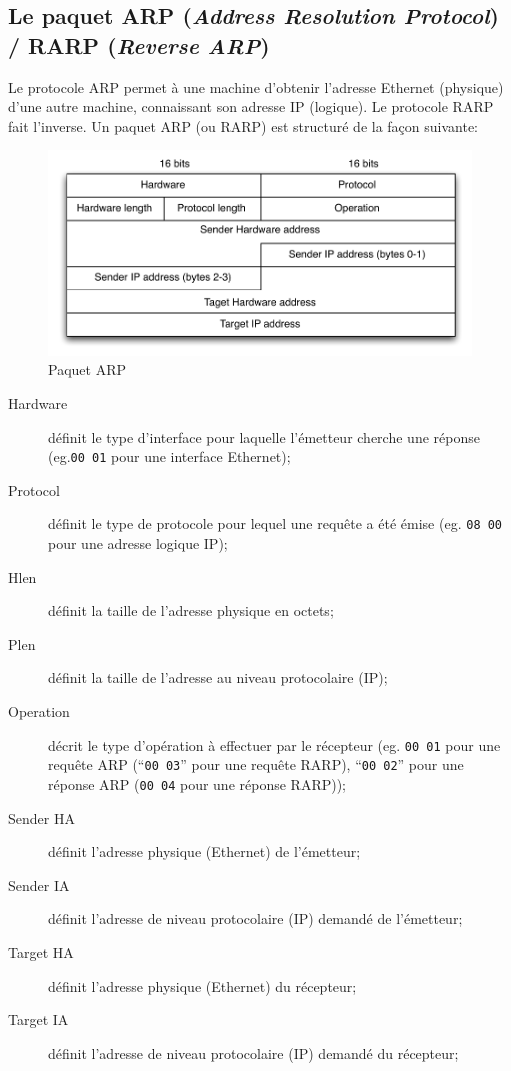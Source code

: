 \documentclass[11pt,english,french]{scrreprt}
\theoremstyle{remark}
\theoremstyle{definition}
\begin{document}
\subsection{Le paquet ARP (\emph{Address Resolution Protocol}) / RARP (\emph{Reverse ARP})} %

Le protocole ARP permet à une machine d'obtenir l'adresse Ethernet (physique) d'une autre machine, connaissant son adresse IP (logique). Le protocole RARP fait l'inverse. Un paquet ARP (ou RARP) est structuré de la façon suivante:

\begin{figure}[h!]
	\center
	\includegraphics[scale=.75]{graphes/IP/ARP}
	\caption{Paquet ARP}
\end{figure}

\begin{description}
	\item [Hardware] définit le type d'interface pour laquelle l'émetteur cherche une réponse (eg.\lstinline!00 01! pour une interface Ethernet);
	\item [Protocol] définit le type de protocole pour lequel une requête a été émise (eg. \lstinline!08 00! pour une adresse logique IP);
	\item [Hlen] définit la taille de l'adresse physique en octets;
	\item [Plen] définit la taille de l'adresse au niveau protocolaire (IP);
	\item [Operation] décrit le type d'opération à effectuer par le récepteur (eg. \lstinline!00 01! pour une requête ARP (“\lstinline!00 03!” pour une requête RARP), “\lstinline!00 02!” pour une réponse ARP (\lstinline!00 04! pour une réponse RARP));
	\item [Sender HA] définit l'adresse physique (Ethernet) de l'émetteur;
	\item [Sender IA] définit l'adresse de niveau protocolaire (IP) demandé de l'émetteur;
	\item [Target HA] définit l'adresse physique (Ethernet) du récepteur;
	\item [Target IA] définit l'adresse de niveau protocolaire (IP) demandé du récepteur;
\end {description}
\end{document}
